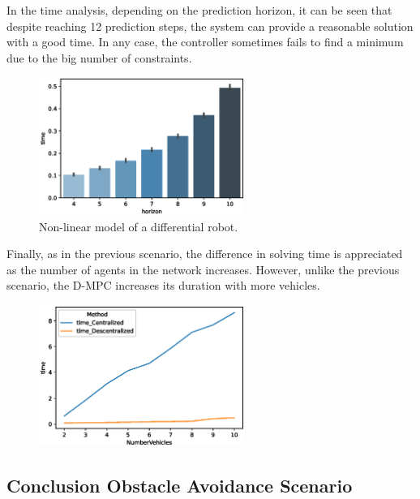 In the time analysis, depending on the prediction horizon, it can be seen that despite reaching 12 prediction steps, the system can provide a reasonable solution with a good time. In any case, the controller sometimes fails to find a minimum due to the big number of constraints.



\begin{figure}[H]
\centering
    \includegraphics[width=0.6\textwidth]{Kap6/obs_avoid/obs_avoid_horizon_time.eps}
    \caption{Non-linear model of a differential robot.}
\end{figure}

Finally, as in the previous scenario, the difference in solving time is appreciated as the number of agents in the network increases. However, unlike the previous scenario, the D-MPC increases its duration with more vehicles.




\begin{figure}[H]
\centering
    \includegraphics[width=0.6\textwidth]{Kap6/obs_avoid/obs_avoid_n_vehicles.eps}

\end{figure}


\subsection{Conclusion Obstacle Avoidance Scenario}

